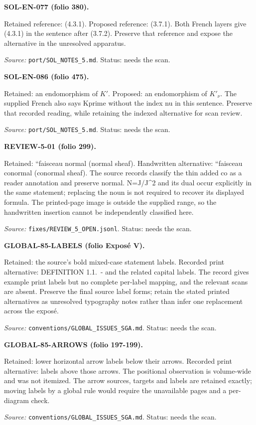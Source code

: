 \medskip\noindent\textbf{SOL-EN-077 (folio 380).}\par
Retained reference: (4.3.1). Proposed reference: (3.7.1).
Both French layers give (4.3.1) in the sentence after (3.7.2). Preserve that reference and expose the alternative in the unresolved apparatus.
\par\noindent\textit{Source: }\texttt{port/SOL\_NOTES\_5.md}. Status: needs the scan.

\medskip\noindent\textbf{SOL-EN-086 (folio 475).}\par
Retained: an endomorphism of $K'$. Proposed: an endomorphism of $K'_\nu$.
The supplied French also says Kprime without the index nu in this sentence. Preserve that recorded reading, while retaining the indexed alternative for scan review.
\par\noindent\textit{Source: }\texttt{port/SOL\_NOTES\_5.md}. Status: needs the scan.

\medskip\noindent\textbf{REVIEW-5-01 (folio 299).}\par
Retained: ``faisceau normal (normal sheaf). Handwritten alternative: ``faisceau conormal (conormal sheaf).
The source records classify the thin added co as a reader annotation and preserve normal. N=J/J\textasciicircum{}2 and its dual occur explicitly in the same statement; replacing the noun is not required to recover its displayed formula. The printed-page image is outside the supplied range, so the handwritten insertion cannot be independently classified here.
\par\noindent\textit{Source: }\texttt{fixes/REVIEW\_5\_OPEN.jsonl}. Status: needs the scan.

\medskip\noindent\textbf{GLOBAL-85-LABELS (folio Exposé V).}\par
Retained: the source’s bold mixed-case statement labels. Recorded print alternative: DEFINITION 1.1.~- and the related capital labels.
The record gives example print labels but no complete per-label mapping, and the relevant scans are absent. Preserve the final source label forms; retain the stated printed alternatives as unresolved typography notes rather than infer one replacement across the exposé.
\par\noindent\textit{Source: }\texttt{conventions/GLOBAL\_ISSUES\_SGA.md}. Status: needs the scan.

\medskip\noindent\textbf{GLOBAL-85-ARROWS (folio 197-199).}\par
Retained: lower horizontal arrow labels below their arrows. Recorded print alternative: labels above those arrows.
The positional observation is volume-wide and was not itemized. The arrow sources, targets and labels are retained exactly; moving labels by a global rule would require the unavailable pages and a per-diagram check.
\par\noindent\textit{Source: }\texttt{conventions/GLOBAL\_ISSUES\_SGA.md}. Status: needs the scan.

